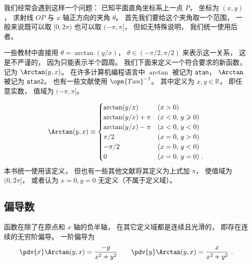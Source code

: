 

我们经常会遇到这样一个问题： 已知平面直角坐标系上一点 $P$， 坐标为 $(x, y)$， 求射线 $OP$ 与 $x$ 轴正方向的夹角 $\theta$。%
首先我们要给这个夹角取一个范围， 一般来说既可以取 $[0, 2\pi)$ 也可以取 $(-\pi, \pi]$， 但如无特殊说明， 我们统一使用后者。

一些教材中直接用 $\theta = \arctan(y/x)$， $\theta \in (-\pi/2, \pi/2)$ 来表示这一关系， 这是不严谨的， 因为只能表示半个圆周。 我们下面来定义一个符合要求的新函数， 记为 $\Arctan(y, x)$。 在许多计算机编程语言中 $\arctan$ 被记为 \lstinline|atan|， $\Arctan$ 被记为 \lstinline|atan2|。 也有一些文献使用 $\opn{Tan}^{-1}$。 其中定义为 $x, y \in \mathbb R$， 即任意实数， 值域为 $(-\pi, \pi]$。

\begin{equation}\label{eq_Arctan_1}
\Arctan(y,x) \equiv 
\begin{cases}
\arctan (y/x) \quad &(x > 0)\\
\arctan (y/x) + \pi  &(x < 0,\,y \geqslant 0)\\
\arctan (y/x) - \pi  &(x < 0,\,y < 0)\\
\pi /2  &(x = 0, \,y > 0)\\
 -\pi /2  &(x = 0, \,y < 0)\\
0 & (x=0,\,y=0)~.
\end{cases}
\end{equation}
本书统一使用该定义， 但也有一些其他文献将其定义为上式加 $\pi$， 使值域为 $(0, 2\pi]$， 或者认为 $x = 0, y = 0$ 无定义（不属于定义域）。

\subsection{偏导数}
函数在除了在原点和 $x$ 轴的负半轴， 在其它定义域都是连续且光滑的， 即存在连续的无穷阶偏导。 一阶偏导为
\begin{equation}
\pdv{x} \Arctan(y, x) = \frac{-y}{x^2 + y^2} \qquad
\pdv{y} \Arctan(y, x) = \frac{x}{x^2 + y^2}~.
\end{equation}
